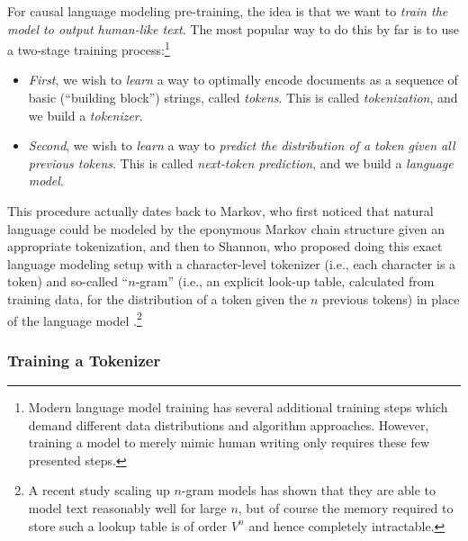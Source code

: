 \documentclass[../../book-main.tex]{subfiles}
\begin{document}
For causal language modeling pre-training, the idea is that we want to \textit{train the model to output human-like text}. The most popular way to do this by far is to use a two-stage training process:\footnote{Modern language model training has several additional training steps which demand different data distributions and algorithm approaches. However, training a model to merely mimic human writing only requires these few presented steps.} 
\begin{itemize}
    \item \textit{First}, we wish to \textit{learn} a way to optimally encode documents as a sequence of basic (``building block'') strings, called \textit{tokens}. This is called \textit{tokenization}, and we build a \textit{tokenizer}.
    \item \textit{Second}, we wish to \textit{learn} a way to \textit{predict the distribution of a token given all previous tokens}. This is called \textit{next-token prediction}, and we build a \textit{language model}.
\end{itemize}
 This procedure actually dates back to Markov, who first noticed that natural language could be modeled by the eponymous Markov chain structure \citep{markov2006example} given an appropriate tokenization, and then to Shannon, who proposed doing this exact language modeling setup with a character-level tokenizer (i.e., each character is a token) and so-called ``\(n\)-gram'' (i.e., an explicit look-up table, calculated from training data, for the distribution of a token given the \(n\) previous tokens) in place of the language model \citep{Shannon-1948}.\footnote{A recent study \citep{liu2024infini} scaling up \(n\)-gram models has shown that they are able to model text reasonably well for large \(n\), but of course the memory required to store such a lookup table is of order \(V^{n}\) and hence completely intractable.}

\subsubsection{Training a Tokenizer}
\end{document}

